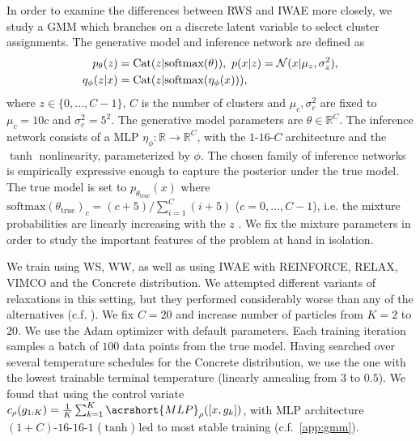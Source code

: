 %
In order to examine the differences between \gls{RWS} and \gls{IWAE} more closely, we study  a \gls{GMM} which branches on a discrete latent variable to select cluster assignments.
The generative model and inference network are defined as
%
\begin{align*}
  p_\theta(z) &= \mathrm{Cat}(z \lvert \mathrm{softmax}(\theta)),\,\,
  p(x \lvert z) = \mathcal{N}(x \lvert \mu_z, \sigma_z^2), \\
  q_\phi(z \lvert x) &= \mathrm{Cat}(z \lvert \mathrm{softmax}(\eta_\phi(x))),
\end{align*}
%
where $z \in \{0, \dotsc, C - 1\}$,  $C$ is the number of clusters and $\mu_c, \sigma_c^2$ are fixed to $\mu_c = 10c$ and $\sigma_c^2 = 5^2$.
The generative model parameters are $\theta \in \mathbb R^C$.
The inference network consists of a \acrlong{MLP} $\eta_\phi: \mathbb R \to \mathbb R^C$, with the $1$-$16$-$C$ architecture and the $\tanh$ nonlinearity, parameterized by $\phi$.
The chosen family of inference networks is empirically expressive enough to capture the posterior under the true model.
The true model is set to $p_{\theta_\text{true}}(x)$ where $\mathrm{softmax}(\theta_\text{true})_c = (c + 5) / \sum_{i = 1}^C (i + 5)$ ($c = 0, \dotsc, C - 1$), i.e. the mixture probabilities are linearly increasing with the $z$
.
We fix the mixture parameters in order to study the important features of the problem at hand in isolation.

We train using \gls{WS}, \gls{WW}, as well as using \gls{IWAE} with \acrshort{REINFORCE}, \acrshort{RELAX}, \gls{VIMCO} and the Concrete distribution.
%
We attempted different variants of relaxations \citep{Rolfe2016dvae,Vahdat2018dvaepp} in this setting, but they performed considerably worse than any of the alternatives (c.f. ).
%
We fix $C = 20$ and increase number of particles from $K = 2$ to $20$.
%
We use the Adam optimizer with default parameters.
%
Each training iteration samples a batch of $100$ data points from the true model.
%
Having searched over several temperature schedules for the Concrete distribution, we use the one with the lowest trainable terminal temperature (linearly annealing from $3$ to $0.5$).
%
We found that using the control variate $c_\rho(g_{1:K}) = \frac{1}{K} \sum_{k = 1}^K \acrshort{MLP}_\rho([x, g_k])$, with \gls{MLP} architecture $(1 + C)$-$16$-$16$-$1$ ($\tanh$) led to most stable training (c.f.\ \cref{app:gmm}).

